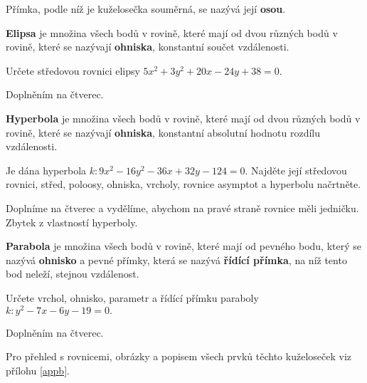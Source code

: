 \begin{definition}
    Přímka, podle níž je kuželosečka souměrná, se nazývá její \textbf{osou}.
\end{definition}

\begin{definition}
\textbf{Elipsa} je množina všech bodů v rovině, které mají od dvou různých bodů v rovině,
které se nazývají \textbf{ohniska}, konstantní součet vzdálenosti.
\end{definition}

\begin{priklad}
Určete středovou rovnici elipsy $5x^2+3y^2+20x-24y+38=0.$
\end{priklad}

\begin{reseni}
Doplněním na čtverec.
\end{reseni}

\begin{definition}
\textbf{Hyperbola} je množina všech bodů v rovině, které mají od dvou různých
bodů v rovině, které se nazývají \textbf{ohniska}, konstantní absolutní
hodnotu rozdílu vzdálenosti.
\end{definition}

\begin{priklad}
Je dána hyperbola $k:9x^2-16y^2-36x+32y-124=0.$ Najděte její středovou rovnici,
střed, poloosy, ohniska, vrcholy, rovnice asymptot a hyperbolu načrtněte.
\end{priklad}

\begin{reseni}
Doplníme na čtverec a vydělíme, abychom na pravé straně rovnice měli jedničku.
Zbytek z vlastností hyperboly.
\end{reseni}

\begin{definition}
\textbf{Parabola} je množina všech bodů v rovině, které mají od pevného bodu, který
se nazývá \textbf{ohnisko} a pevné přímky, která se nazývá \textbf{řídící přímka},
na níž tento bod neleží, stejnou vzdálenost.
\end{definition}

\begin{priklad}
Určete vrchol, ohnisko, parametr a řídící přímku paraboly $k:y^2-7x-6y-19=0.$
\end{priklad}

\begin{reseni}
Doplněním na čtverec.
\end{reseni}

\begin{pozn}
    Pro přehled s rovnicemi, obrázky a popisem všech prvků těchto kuželoseček
    viz přílohu \ref{appb}.
\end{pozn}

